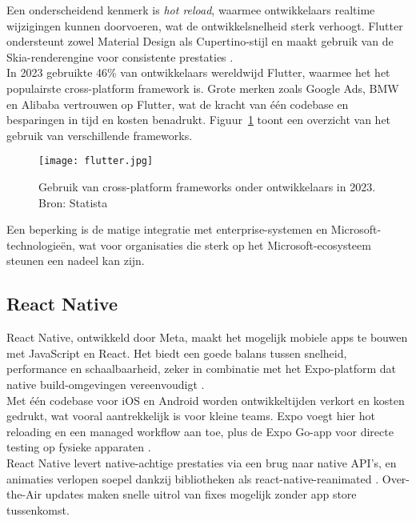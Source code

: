 Een onderscheidend kenmerk is \emph{hot reload}, waarmee ontwikkelaars realtime wijzigingen kunnen doorvoeren, wat de ontwikkelsnelheid sterk verhoogt. Flutter ondersteunt zowel Material Design als Cupertino-stijl en maakt gebruik van de Skia-renderengine voor consistente prestaties \autocite{Rodriguez2025}.\\

In 2023 gebruikte 46\% van ontwikkelaars wereldwijd Flutter, waarmee het het populairste cross-platform framework is. Grote merken zoals Google Ads, BMW en Alibaba vertrouwen op Flutter, wat de kracht van één codebase en besparingen in tijd en kosten benadrukt. Figuur~\ref{fig:flutter} toont een overzicht van het gebruik van verschillende frameworks.\\

\begin{figure}[h]
    \centering
    \texttt{[image: flutter.jpg]}
    \caption{Gebruik van cross-platform frameworks onder ontwikkelaars in 2023. Bron: Statista \autocite{Rodriguez2025}}
    \label{fig:flutter}
\end{figure}

Een beperking is de matige integratie met enterprise-systemen en Microsoft-technologieën, wat voor organisaties die sterk op het Microsoft-ecosysteem steunen een nadeel kan zijn.

\subsection{React Native}
React Native, ontwikkeld door Meta, maakt het mogelijk mobiele apps te bouwen met JavaScript en React. Het biedt een goede balans tussen snelheid, performance en schaalbaarheid, zeker in combinatie met het Expo-platform dat native build-omgevingen vereenvoudigt \autocite{Ivanov2025}.\\

Met één codebase voor iOS en Android worden ontwikkeltijden verkort en kosten gedrukt, wat vooral aantrekkelijk is voor kleine teams. Expo voegt hier hot reloading en een managed workflow aan toe, plus de Expo Go-app voor directe testing op fysieke apparaten \autocite{Ivanov2025}.\\

React Native levert native-achtige prestaties via een brug naar native API's, en animaties verlopen soepel dankzij bibliotheken als react-native-reanimated \autocite{Ivanov2025}. Over-the-Air updates maken snelle uitrol van fixes mogelijk zonder app store tussenkomst.\\

